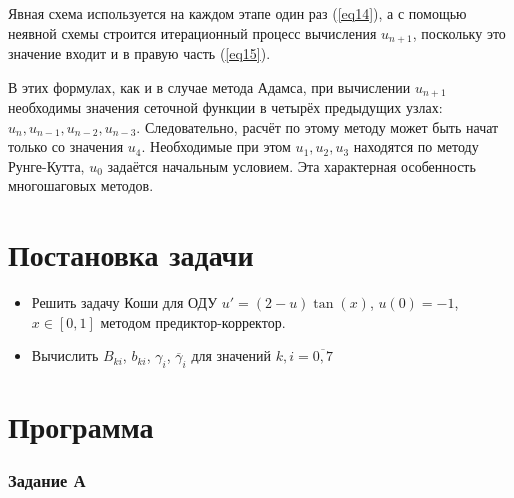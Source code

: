 \documentclass[
11pt,
master, %
subf, %
href, %
colorlinks=true, %
times, %
]{disser}
\begin{document}
Явная схема используется на каждом этапе один раз (\ref{eq14}), а с помощью неявной схемы строится итерационный процесс вычисления $u_{n+1}$, поскольку это значение входит и в правую часть (\ref{eq15}).

В этих формулах, как и в случае метода Адамса, при вычислении $u_{n+1}$ необходимы значения сеточной функции в четырёх предыдущих узлах: $u_n, u_{n-1}, u_{n-2}, u_{n-3}$. Следовательно, расчёт по этому методу может быть начат только со значения $u_4$. Необходимые при этом $u_1, u_2, u_3$ находятся по методу Рунге-Кутта, $u_0$ задаётся начальным условием. Эта характерная особенность многошаговых методов.


\newpage
\section{Постановка задачи}
\begin{itemize}
  \item Решить задачу Коши для ОДУ $u' = (2-u)\tan(x)$, $u(0) = -1$, $x\in [0,1]$ методом предиктор-корректор.
  \item Вычислить $B_{ki}$, $b_{ki}$, $\gamma_i$, $\overline{\gamma}_i$ для значений $k, i = \overline{0,7}$
\end{itemize}

\newpage
\section{Программа}
\subsubsection{Задание А}
\end{document}
